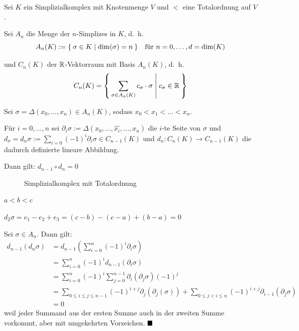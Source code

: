 \begin{bemerkung}\label{kor:9.11}
    Sei $K$ ein  Simplizialkomplex mit Knotenmenge $V$
    und $<$ eine Totalordnung auf $V$.

    Sei $A_n$ die Menge der $n$-Simplizes in $K$, d.~h.
    \[A_n(K) := \Set{ \sigma \in K | \dim(\sigma) = n}\;\;\; \text{für } n=0, \dots, d=\dim(K)\]

    und $C_n(K)$ der $\mathbb{R}$-Vektorraum mit Basis $A_n(K)$, d.~h.
    \[C_n(K) = \Set{\sum_{\sigma \in A_n(K)} c_\sigma \cdot \sigma | c_\sigma \in \ensuremath{\mathbb{R}}}\]

    Sei $\sigma = \Delta(x_0, \dots, x_n) \in A_n(K)$, sodass 
    $x_0 < x_1 < \dots < x_n$.

    Für $i = 0, \dots, n$ sei $\partial_i \sigma := \Delta(x_0, \dots, \hat{x_i}, \dots, x_n)$
    die $i$-te Seite von $\sigma$ und $d_\sigma = d_n \sigma := \sum_{i=0} (-1)^i \partial_i \sigma \in C_{n-1} (K)$
    und $d_n: C_n(K) \rightarrow C_{n-1}(K)$ die dadurch definierte lineare
    Abbildung.

    Dann gilt: $d_{n-1} \circ d_n = 0$
\end{bemerkung}

\begin{beispiel}
    \begin{figure}[h!]
        \centering
        
        \caption{Simplizialkomplex mit Totalordnung}
    \end{figure}

    $a < b < c$

    $d_2 \sigma = e_1 - e_2 + e_3 = (c - b) - (c-a) + (b - a) = 0$

\end{beispiel}

\begin{beweis}
    Sei $\sigma \in A_n$. Dann gilt:
    \begin{align*}
        d_{n-1}(d_n \sigma) &= d_{n-1} (\sum_{i=0}^n (-1)^i \partial_i \sigma)\\
        &= \sum_{i=0}^n (-1)^i d_{n-1} (\partial_i \sigma)\\
        &= \sum_{i=0}^n (-1)^i \sum_{j=0}^{n-1} \partial_i (\partial_j \sigma) (-1)^j\\
        &= \sum_{0 \leq i \leq j \leq n-1} (-1)^{i+j} \partial_j (\partial_j (\sigma)) + \sum_{0 \leq j < i \leq n} (-1)^{i+j} \partial_{i-1} (\partial_j \sigma)\\
        &= 0
    \end{align*}
    weil jeder Summand aus der ersten Summe auch in der zweiten
    Summe vorkommt, aber mit umgekehrten Vorzeichen. $\qed$
\end{beweis}

